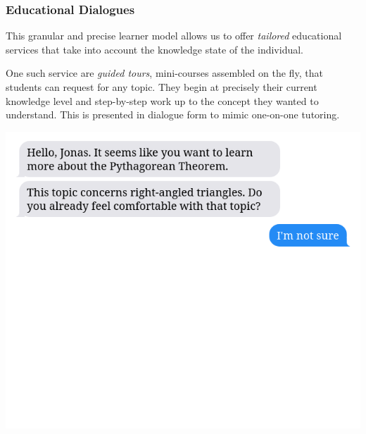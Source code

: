 \documentclass[aspectratio=169, usenames, dvipsnames]{beamer}
\begin{document}
\begin{frame}
\frametitle{Educational Dialogues}
\begin{minipage}{0.45\textwidth}
This granular and precise learner model allows us to offer \emph{tailored}
educational services that take into account the knowledge state of the individual.
\bigskip

One such service are \emph{guided tours}, mini-courses assembled on the fly, that students can request for any topic. They begin at precisely their current knowledge level and step-by-step work up to the concept they wanted to understand. This is presented in dialogue form to mimic one-on-one tutoring.
\end{minipage}%
\hfill
\begin{minipage}{0.5\textwidth}
\includegraphics[height=0.75\textheight,keepaspectratio]{images/bubbles_example_step2} 
\end{minipage}%
\end{frame}
\end{document}
